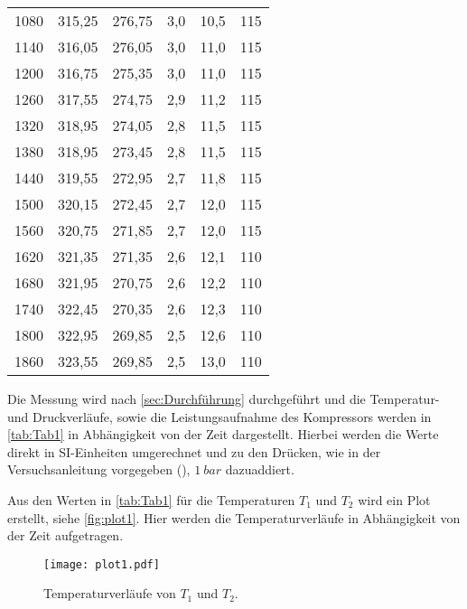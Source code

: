 \begin{table}[H]
\begin{tabular}{S[table-format=4.0] S S S[table-format=1.1] S[table-format=2.1] S[table-format=3.0]}
      1080 & 315,25 & 276,75 & 3,0 & 10,5 & 115\\
      1140 & 316,05 & 276,05 & 3,0 & 11,0 & 115\\
      1200 & 316,75 & 275,35 & 3,0 & 11,0 & 115\\
      1260 & 317,55 & 274,75 & 2,9 & 11,2 & 115\\
      1320 & 318,95 & 274,05 & 2,8 & 11,5 & 115\\
      1380 & 318,95 & 273,45 & 2,8 & 11,5 & 115\\
      1440 & 319,55 & 272,95 & 2,7 & 11,8 & 115\\
      1500 & 320,15 & 272,45 & 2,7 & 12,0 & 115\\
      1560 & 320,75 & 271,85 & 2,7 & 12,0 & 115\\
      1620 & 321,35 & 271,35 & 2,6 & 12,1 & 110\\
      1680 & 321,95 & 270,75 & 2,6 & 12,2 & 110\\
      1740 & 322,45 & 270,35 & 2,6 & 12,3 & 110\\
      1800 & 322,95 & 269,85 & 2,5 & 12,6 & 110\\
      1860 & 323,55 & 269,85 & 2,5 & 13,0 & 110\\
    \bottomrule
  \end{tabular}
\end{table}

Die Messung wird nach \autoref{sec:Durchführung} durchgeführt und die Temperatur- und Druckverläufe, sowie die Leistungsaufnahme des Kompressors
werden in \autoref{tab:Tab1} in Abhängigkeit von der Zeit dargestellt.
Hierbei werden die Werte direkt in SI-Einheiten umgerechnet und zu den Drücken, wie in der Versuchsanleitung vorgegeben (\cite{v206}),
$\qty{1}{bar}$ dazuaddiert.

Aus den Werten in \autoref{tab:Tab1} für die Temperaturen $T_1$ und $T_2$ wird ein Plot erstellt, siehe \autoref{fig:plot1}.
Hier werden die Temperaturverläufe in Abhängigkeit von der Zeit aufgetragen.

\begin{figure}
  \centering
  \texttt{[image: plot1.pdf]}
  \caption{Temperaturverläufe von $T_1$ und $T_2$.}
  \label{fig:plot1}
\end{figure}

